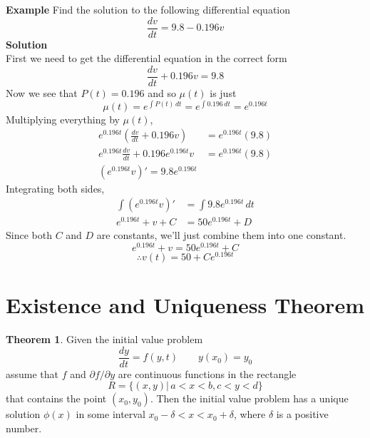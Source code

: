\documentclass[10pt,reqno]{book}
\theoremstyle{definition}
\newtheorem{theorem}{Theorem}[section]
\begin{document}
	\noindent \textbf{Example} Find the solution to the following differential equation
	\[ \frac{dv}{dt} = 9.8 - 0.196v \]
	\textbf{Solution}\\
	First we need to get the differential equation in the correct form
	\[ \frac{dv}{dt} + 0.196v = 9.8 \]
	Now we see that $ P(t) = 0.196 $ and so $ \mu(t) $ is just
	\[ \mu(t) = e^{\int P(t)\,dt} = e^{\int 0.196\,dt} = e^{0.196t} \]
	Multiplying everything by $ \mu(t) $,
	\begin{align*}
		e^{0.196t} \left( \frac{dv}{dt} + 0.196v\right) &= e^{0.196t}(9.8)\\
		e^{0.196t} \frac{dv}{dt} + 0.196 e^{0.196t} v &= e^{0.196t}(9.8)\\
		(e^{0.196t} v)' = 9.8 e^{0.196t}
	\end{align*}
	Integrating both sides,
	\begin{align*}
		\int (e^{0.196t} v)' &= \int 9.8 e^{0.196t}\,dt\\
		e^{0.196t} + v + C &= 50 e^{0.196t} + D
	\end{align*}
	Since both $ C $ and $ D $ are constants, we'll just combine them into one constant.
	\[ e^{0.196t} + v = 50 e^{0.196t} + C \]
	\[ \therefore v(t) = 50 + Ce^{0.196t} \]


	\section{Existence and Uniqueness Theorem}

	\begin{theorem}
		Given the initial value problem
		\[ \frac{dy}{dt} = f(y,t) \qquad y(x_0) = y_0 \]
		assume that $ f $ and $ \partial f / \partial y $ are continuous functions in the rectangle
		\[ R = \{ (x,y) \vert\, a < x < b, c < y < d  \} \]
		that contains the point $ (x_0,y_0) $. Then the initial value problem has a unique solution $ \phi(x) $ in some interval $ x_0 - \delta < x < x_0 + \delta $, where $ \delta $ is a positive number.
	\end{theorem}
\end{document}
